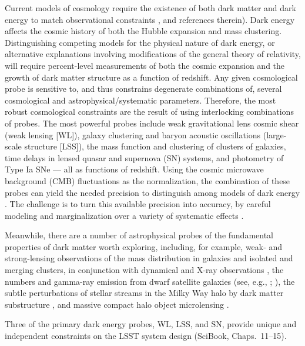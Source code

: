 Current models of cosmology require the existence of both dark matter and dark
energy to match observational constraints
\citep{2007ApJ...659...98R,2009ApJS..180..330K,2010MNRAS.401.2148P,2012arXiv1211.0310L,2015PNAS..11212249W}, and
references therein). Dark energy affects the cosmic history of both the Hubble expansion
and mass clustering. Distinguishing competing models for the physical
nature of dark energy, or alternative explanations involving
modifications of the general theory of relativity, will require
percent-level measurements of both the cosmic expansion and the growth
of dark matter structure as a function of redshift.  Any given
cosmological probe is sensitive to, and thus constrains degenerate
combinations of, several cosmological and astrophysical/systematic parameters.  Therefore, the most robust
cosmological constraints are the result of using interlocking combinations
of probes. The most powerful probes include weak gravitational lens cosmic shear (weak lensing [WL]), galaxy clustering and baryon
acoustic oscillations (large-scale structure [LSS]), the mass function and clustering of clusters of galaxies,
time delays in lensed quasar and supernova (SN) systems,
and photometry of Type Ia SNe --- all as functions of
redshift. Using the cosmic microwave background (CMB) fluctuations as the normalization, the
combination of these probes can yield the needed precision to distinguish among models of dark
energy \citep[see, e.g.,][and references therein]{2006JCAP...08..008Z}. The challenge is to turn this available precision into accuracy, by careful modeling and marginalization over a variety of systematic effects \citep[see, e.g.,][]{2017MNRAS.470.2100K}.

Meanwhile, there are a number of astrophysical probes of the fundamental
properties of dark matter worth exploring, including, for example,
weak- and strong-lensing observations of the mass distribution in
galaxies and isolated and
merging clusters, in conjunction with dynamical and
X-ray observations \citep[see, e.g.,][]{2012ApJ...747L..42D,
2013ApJ...765...24N, 2013MNRAS.430...81R}, the numbers and gamma-ray
emission from dwarf satellite galaxies (see, e.g., \citealt{2014ApJ...795L..13H};
\citealt{2015ApJ...809L...4D}),  the subtle perturbations of stellar
streams in the Milky Way halo by dark matter substructure
\citep{2016MNRAS.456..602B}, and massive compact halo object
microlensing \citep{2001ApJ...550L.169A}.

Three of the primary dark energy probes, WL, LSS, and SN,  provide unique and
independent constraints on the LSST system design (SciBook, Chaps.~11--15).

